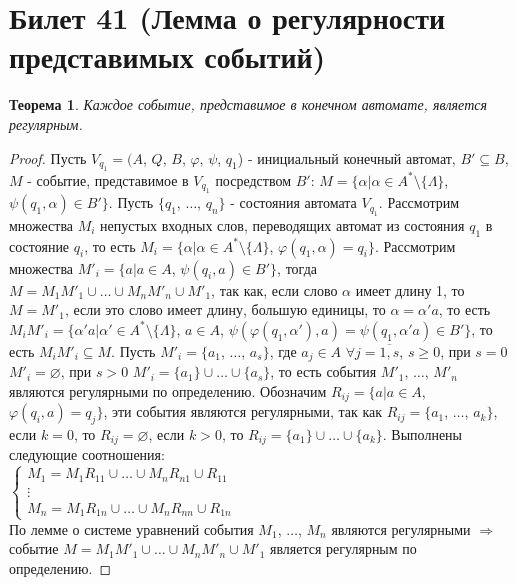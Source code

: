 \documentclass[a4paper, 12pt]{article}
\renewcommand{\phi}{\varphi}
\theoremstyle{definition}
\theoremstyle{plain}
\newtheorem*{theorem}{Теорема}
\theoremstyle{remark}
\begin{document}
  \section{Билет 41 (Лемма о регулярности представимых событий)}
  \begin{theorem}
    Каждое событие, представимое в конечном автомате, является регулярным.
  \end{theorem}
  \begin{proof}
    Пусть $V_{q_1}=(A$, $Q$, $B$, $\phi$, $\psi$, $q_1$) - инициальный конечный автомат, $B'\subseteq B$, $M$ - событие, представимое в $V_{q_1}$ посредством $B'$: $M=\{\alpha|\alpha\in A^*\setminus\{\Lambda\}$, $\psi(q_1,\alpha)\in B'\}$. Пусть $\{q_1$, $\ldots$, $q_n\}$ - состояния автомата $V_{q_1}$. Рассмотрим множества $M_i$ непустых входных слов, переводящих автомат из состояния $q_1$ в состояние $q_i$, то есть $M_i=\{\alpha|\alpha\in A^*\setminus\{\Lambda\}$, $\phi(q_1,\alpha)=q_i\}$. Рассмотрим множества $M'_i=\{a|a\in A$, $\psi(q_i,a)\in B'\}$, тогда $M=M_1M'_1\cup\ldots\cup M_nM'_n\cup M'_1$, так как, если слово $\alpha$ имеет длину 1, то $M=M'_1$, если это слово имеет длину, большую единицы, то $\alpha=\alpha'a$, то есть $M_iM'_i=\{\alpha' a|\alpha'\in A^*\setminus\{\Lambda\}$, $a\in A$, $\psi(\phi(q_1,\alpha'),a)=\psi(q_1,\alpha' a)\in B'\}$, то есть $M_iM'_i\subseteq M$. Пусть $M'_i=\{a_1$, $\ldots$, $a_s\}$, где $a_j\in A$ $\forall j=\overline{1,s}$, $s\geqslant0$, при $s=0$ $M'_i=\varnothing$, при $s>0$ $M'_i=\{a_1\}\cup\ldots\cup\{a_s\}$, то есть события $M'_1$, $\ldots$, $M'_n$ являются регулярными по определению. Обозначим $R_{ij}=\{a|a\in A$, $\phi(q_i,a)=q_j\}$, эти события являются регулярными, так как $R_{ij}=\{a_1$, $\ldots$, $a_k\}$, если $k=0$, то $R_{ij}=\varnothing$, если $k>0$, то $R_{ij}=\{a_1\}\cup\ldots\cup\{a_k\}$. Выполнены следующие соотношения:\\
    $\begin{cases}
      M_1=M_1R_{11}\cup\ldots\cup M_nR_{n1}\cup R_{11}\\
      \vdots\\
      M_n=M_1R_{1n}\cup\ldots\cup M_nR_{nn}\cup R_{1n}
    \end{cases}$\\
    По лемме о системе уравнений события $M_1$, $\ldots$, $M_n$ являются регулярными $\Longrightarrow$ событие $M=M_1M'_1\cup\ldots\cup M_nM'_n\cup M'_1$ является регулярным по определению.
  \end{proof}
\end{document}
